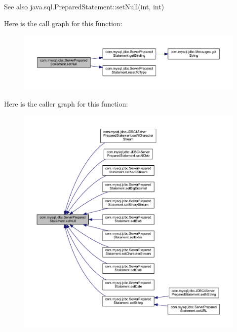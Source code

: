 \begin{DoxySeeAlso}{See also}
java.\+sql.\+Prepared\+Statement\+::set\+Null(int, int) 
\end{DoxySeeAlso}
Here is the call graph for this function\+:
\nopagebreak
\begin{figure}[H]
\begin{center}
\leavevmode
\includegraphics[width=350pt]{classcom_1_1mysql_1_1jdbc_1_1_server_prepared_statement_ad4e2103ca03ca7d468bcfb5bd4adc48e_cgraph}
\end{center}
\end{figure}
Here is the caller graph for this function\+:
\nopagebreak
\begin{figure}[H]
\begin{center}
\leavevmode
\includegraphics[width=350pt]{classcom_1_1mysql_1_1jdbc_1_1_server_prepared_statement_ad4e2103ca03ca7d468bcfb5bd4adc48e_icgraph}
\end{center}
\end{figure}
\mbox{\label{classcom_1_1mysql_1_1jdbc_1_1_server_prepared_statement_a1b4bbc47755290d3b7ff6598aa127389}} 
